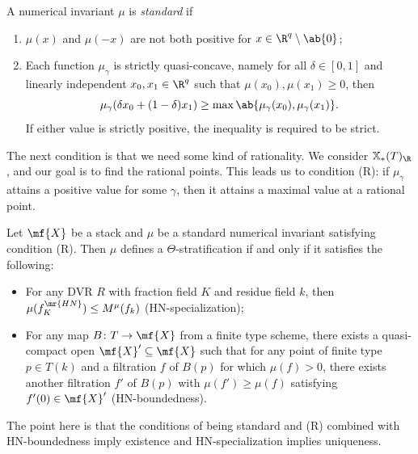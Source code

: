 \begin{defn}
    A numerical invariant \(\mu\) is \textit{standard} if
    \begin{enumerate}
        \item \(\mu(x)\) and \(\mu(-x)\) are not both positive for \(x \in \R^q \setminus \ab\{0\}\);
        \item Each function \(\mu_{\gamma}\) is strictly quasi-concave, namely for all \(\delta \in [0,1]\) and linearly independent \(x_0, x_1 \in \R^q\) such that \(\mu(x_0), \mu(x_1) \geq 0\), then 
            \[\mu_{\gamma}(\delta x_0 + (1-\delta)x_1) \geq \max\ab\{\mu_{\gamma}(x_0), \mu_{\gamma}(x_1)\}.\] If either value is strictly positive, the inequality is required to be strict.
    \end{enumerate}
\end{defn}

The next condition is that we need some kind of rationality. We consider \(\mathbb{X}_*(T)_{\R}\), and our goal is to find the rational points. This leads us to condition (R): if \(\mu_{\gamma}\) attains a positive value for some \(\gamma\), then it attains a maximal value at a rational point.

\begin{thm}
    Let \(\mf{X}\) be a stack and \(\mu\) be a standard numerical invariant satisfying condition (R). Then \(\mu\) defines a \(\Theta\)-stratification if and only if it satisfies the following:
    \begin{itemize}
        \item For any DVR \(R\) with fraction field \(K\) and residue field \(k\), then \(\mu(f_K^{\mr{HN}}) \leq M^{\mu}(f_k)\) (HN-specialization);
        \item For any map \(B \colon T \to \mf{X}\) from a finite type scheme, there exists a quasi-compact open \(\mf{X}' \subseteq \mf{X}\) such that for any point of finite type \(p \in T(k)\) and a filtration \(f\) of \(B(p)\) for which \(\mu(f) > 0\), there exists another filtration \(f'\) of \(B(p)\) with \(\mu(f') \geq \mu(f)\) satisfying \(f'(0) \in \mf{X}'\) (HN-boundedness).
    \end{itemize}
\end{thm}

The point here is that the conditions of being standard and (R) combined with HN-boundedness imply existence and HN-specialization implies uniqueness.



